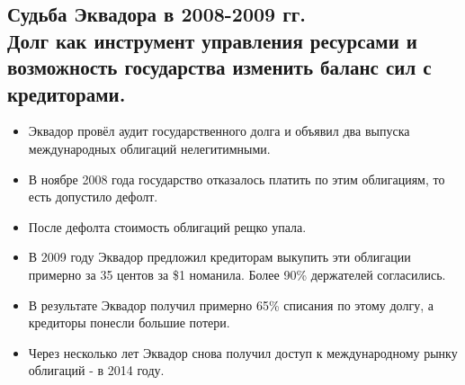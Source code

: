 \documentclass[12pt]{article}
\begin{document}
\subsection{Судьба Эквадора в 2008-2009 гг. \\Долг как инструмент управления ресурсами и возможность государства изменить баланс сил с кредиторами.}
\begin{itemize}
  \item Эквадор провёл аудит государственного долга и объявил два выпуска международных облигаций нелегитимными.
  \item В ноябре 2008 года государство отказалось платить по этим облигациям, то есть допустило дефолт.
  \item После дефолта стоимость облигаций рещко упала.
  \item В 2009 году Эквадор предложил кредиторам выкупить эти облигации примерно за 35 центов за \$1 номанила. Более 90\% держателей согласились.
  \item В результате Эквадор получил примерно 65\% списания по этому долгу, а кредиторы понесли большие потери.
  \item Через несколько лет Эквадор снова получил доступ к международному рынку облигаций - в 2014 году.
\end{itemize}
\

\printbibliography
\end{document}
